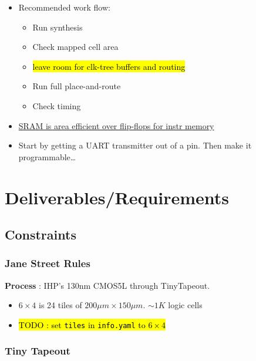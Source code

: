 \documentclass[a4paper]{report}
\begin{document}
			\begin{itemize}
				\item Recommended work flow:
					\begin{itemize}
						\item Run synthesis
						\item Check mapped cell area
						\item \hl{leave room for clk-tree buffers and routing}
						\item Run full place-and-route
						\item Check timing
					\end{itemize}

				\item \href{https://www.tinytapeout.com/chips/ttihp0p2/tt_um_urish_sram_test}{SRAM is area efficient over flip-flops for instr memory}
					
				\item Start by getting a UART transmitter out of a pin. 
					Then make it programmable\ldots

			\end{itemize}

	\chapter{Deliverables/Requirements}

		\section{Constraints}

			\subsection{Jane Street Rules}
				\textbf{Process} : IHP's 130nm CMOS5L through TinyTapeout. \\ 
				
				\begin{itemize}
					\item $6 \times 4$ is 24 tiles of $200\mu m \times 150\mu m$. $\sim1K$ logic cells
					\item \hl{TODO : set \texttt{tiles} in \texttt{info.yaml} to $6\times4$}
				\end{itemize}

				

			\subsection{Tiny Tapeout}
\end{document}
